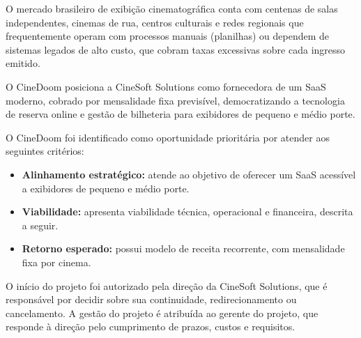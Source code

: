 
O mercado brasileiro de exibição cinematográfica conta com centenas de salas independentes, cinemas de rua, centros culturais e redes regionais que frequentemente operam com processos manuais (planilhas) ou dependem de sistemas legados de alto custo, que cobram taxas excessivas sobre cada ingresso emitido.

O CineDoom posiciona a CineSoft Solutions como fornecedora de um SaaS moderno, cobrado por mensalidade fixa previsível, democratizando a tecnologia de reserva online e gestão de bilheteria para exibidores de pequeno e médio porte.


O CineDoom foi identificado como oportunidade prioritária por atender aos seguintes critérios:

\begin{itemize}
\item \textbf{Alinhamento estratégico:} atende ao objetivo de oferecer um SaaS acessível a exibidores de pequeno e médio porte.
\item \textbf{Viabilidade:} apresenta viabilidade técnica, operacional e financeira, descrita a seguir.
\item \textbf{Retorno esperado:} possui modelo de receita recorrente, com mensalidade fixa por cinema.
\end{itemize}

O início do projeto foi autorizado pela direção da CineSoft Solutions, que é responsável por decidir sobre sua continuidade, redirecionamento ou cancelamento. A gestão do projeto é atribuída ao gerente do projeto, que responde à direção pelo cumprimento de prazos, custos e requisitos.


